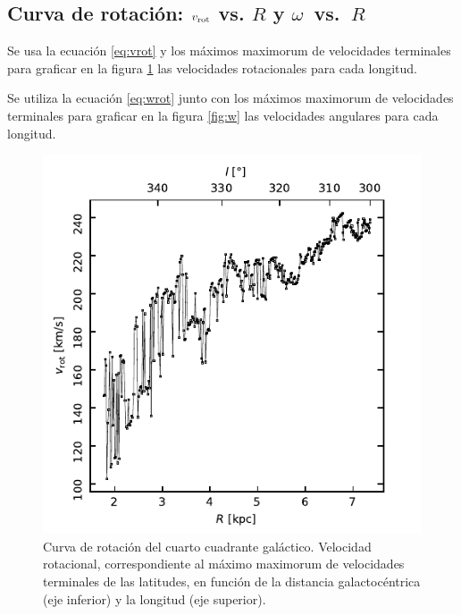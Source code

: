 \subsection{Curva de rotación: $v_{\textnormal{rot}}$ vs. $R$ y \mbox{$\omega$ vs. $R$}}

Se usa la ecuación \ref{eq:vrot} y los máximos maximorum de velocidades terminales para graficar en la figura \ref{fig:vrot} las velocidades rotacionales para cada longitud.

Se utiliza la ecuación \ref{eq:wrot} junto con los máximos maximorum de velocidades terminales para graficar en la figura \ref{fig:w} las velocidades angulares para cada longitud.

\begin{figure}[htbp]
	\includegraphics{rsc/vrot.pdf}
	\caption{Curva de rotación del cuarto cuadrante galáctico. Velocidad rotacional, correspondiente al máximo maximorum de velocidades terminales de las latitudes, en función de la distancia galactocéntrica (eje inferior) y la longitud (eje superior).}
	\label{fig:vrot}
\end{figure}

